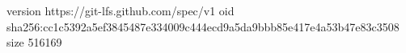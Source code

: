 version https://git-lfs.github.com/spec/v1
oid sha256:cc1c5392a5ef3845487e334009c444ecd9a5da9bbb85e417e4a53b47e83c3508
size 516169
